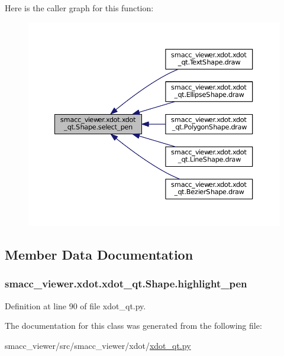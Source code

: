 Here is the caller graph for this function\+:
\nopagebreak
\begin{figure}[H]
\begin{center}
\leavevmode
\includegraphics[width=350pt]{classsmacc__viewer_1_1xdot_1_1xdot__qt_1_1Shape_a7f20c9ecdb3c6117b8d1185c8155b122_icgraph}
\end{center}
\end{figure}




\subsection{Member Data Documentation}
\subsubsection[{\texorpdfstring{highlight\+\_\+pen}{highlight_pen}}]{\setlength{\rightskip}{0pt plus 5cm}smacc\+\_\+viewer.\+xdot.\+xdot\+\_\+qt.\+Shape.\+highlight\+\_\+pen}\hypertarget{classsmacc__viewer_1_1xdot_1_1xdot__qt_1_1Shape_a464b56cf481106c7a078eb195617c3c2}{}\label{classsmacc__viewer_1_1xdot_1_1xdot__qt_1_1Shape_a464b56cf481106c7a078eb195617c3c2}


Definition at line 90 of file xdot\+\_\+qt.\+py.



The documentation for this class was generated from the following file\+:\begin{DoxyCompactItemize}
\item 
smacc\+\_\+viewer/src/smacc\+\_\+viewer/xdot/\hyperlink{xdot__qt_8py}{xdot\+\_\+qt.\+py}\end{DoxyCompactItemize}
